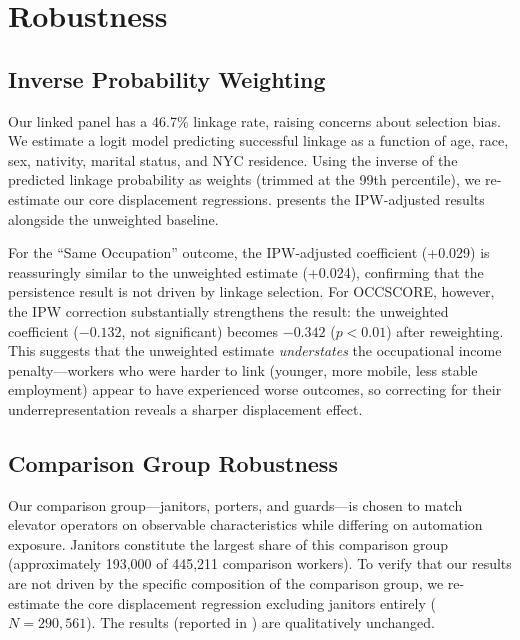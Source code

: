 \documentclass[12pt]{article}
\begin{document}

\section{Robustness} \label{sec:robustness}

\subsection{Inverse Probability Weighting}

Our linked panel has a 46.7\% linkage rate, raising concerns about selection bias. We estimate a logit model predicting successful linkage as a function of age, race, sex, nativity, marital status, and NYC residence. Using the inverse of the predicted linkage probability as weights (trimmed at the 99th percentile), we re-estimate our core displacement regressions.  presents the IPW-adjusted results alongside the unweighted baseline.



For the ``Same Occupation'' outcome, the IPW-adjusted coefficient (+0.029) is reassuringly similar to the unweighted estimate (+0.024), confirming that the persistence result is not driven by linkage selection. For OCCSCORE, however, the IPW correction substantially strengthens the result: the unweighted coefficient ($-0.132$, not significant) becomes $-0.342$ ($p < 0.01$) after reweighting. This suggests that the unweighted estimate \emph{understates} the occupational income penalty---workers who were harder to link (younger, more mobile, less stable employment) appear to have experienced worse outcomes, so correcting for their underrepresentation reveals a sharper displacement effect.

\subsection{Comparison Group Robustness}

Our comparison group---janitors, porters, and guards---is chosen to match elevator operators on observable characteristics while differing on automation exposure. Janitors constitute the largest share of this comparison group (approximately 193,000 of 445,211 comparison workers). To verify that our results are not driven by the specific composition of the comparison group, we re-estimate the core displacement regression excluding janitors entirely ($N = 290{,}561$). The results (reported in ) are qualitatively unchanged.
\end{document}
